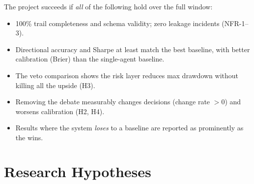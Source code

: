 \documentclass[conference]{IEEEtran}
\begin{document}
The project succeeds if \emph{all} of the following hold over the full window:
\begin{itemize}[leftmargin=*,itemsep=1pt,topsep=2pt]
  \item 100\% trail completeness and schema validity; zero leakage incidents (NFR-1--3).
  \item Directional accuracy and Sharpe at least match the best baseline, with better calibration (Brier) than the single-agent baseline.
  \item The veto comparison shows the risk layer reduces max drawdown without killing all the upside (H3).
  \item Removing the debate measurably changes decisions (change rate $> 0$) and worsens calibration (H2, H4).
  \item Results where the system \emph{loses} to a baseline are reported as prominently as the wins.
\end{itemize}

\section{Research Hypotheses}
\label{sec:hypotheses}
\end{document}
